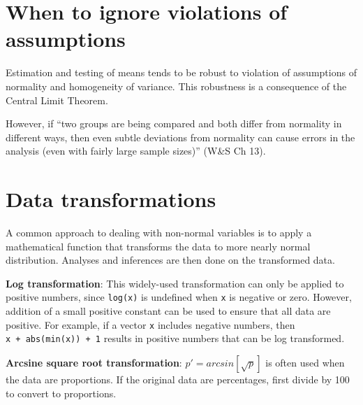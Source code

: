 \documentclass[]{book}
\newenvironment{Shaded}{\begin{snugshade}}{\end{snugshade}}
\newcommand{\CommentTok}[1]{\textcolor[rgb]{0.56,0.35,0.01}{\textit{#1}}}
\newcommand{\KeywordTok}[1]{\textcolor[rgb]{0.13,0.29,0.53}{\textbf{#1}}}
\newcommand{\NormalTok}[1]{#1}
\newcommand{\OperatorTok}[1]{\textcolor[rgb]{0.81,0.36,0.00}{\textbf{#1}}}
\theoremstyle{definition}
\theoremstyle{definition}
\theoremstyle{definition}
\theoremstyle{remark}
\begin{document}
\begin{Shaded}
\end{Shaded}

\hypertarget{when-to-ignore-violations-of-assumptions}{%
\section{When to ignore violations of
assumptions}\label{when-to-ignore-violations-of-assumptions}}

Estimation and testing of means tends to be robust to violation of
assumptions of normality and homogeneity of variance. This robustness is
a consequence of the Central Limit Theorem.

However, if ``two groups are being compared and both differ from
normality in different ways, then even subtle deviations from normality
can cause errors in the analysis (even with fairly large sample sizes)''
(W\&S Ch 13).

\hypertarget{data-transformations}{%
\section{Data transformations}\label{data-transformations}}

A common approach to dealing with non-normal variables is to apply a
mathematical function that transforms the data to more nearly normal
distribution. Analyses and inferences are then done on the transformed
data.

\textbf{Log transformation}: This widely-used transformation can only be
applied to positive numbers, since \texttt{log(x)} is undefined when
\texttt{x} is negative or zero. However, addition of a small positive
constant can be used to ensure that all data are positive. For example,
if a vector \texttt{x} includes negative numbers, then
\texttt{x\ +\ abs(min(x))\ +\ 1} results in positive numbers that can be
log transformed.

\textbf{Arcsine square root transformation}: \(p' = arcsin[\sqrt{p}]\)
is often used when the data are proportions. If the original data are
percentages, first divide by 100 to convert to proportions.
\end{document}
